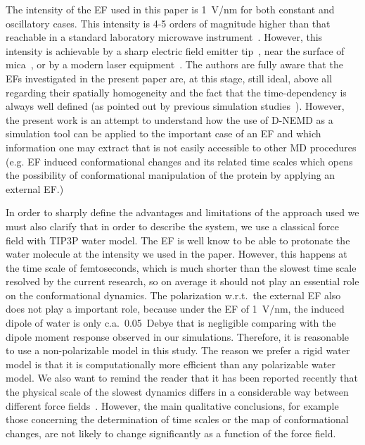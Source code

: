 \documentclass[a4paper,preprint,unsortedaddress,onecolumn]{revtex4-1}
\newcommand{\recheck}[1]{{\color{red} #1}}
\begin{document}
The intensity of the EF used in this paper is 1~V/nm for both constant
and oscillatory cases. This intensity is 4-5 orders of magnitude
higher than that reachable in a standard laboratory microwave
instrument~\cite{damm2012can}. However, this intensity is achievable
by a sharp electric field emitter tip~\cite{scovell2000phase}, near
the surface of mica~\cite{starzyk2013proteins}, or by a modern laser
equipment~\cite{vogel2008femtosecond}. The authors are fully aware
that the EFs investigated in the present paper are, \recheck{at this stage, still ideal, above all regarding their spatially homogeneity and
  the fact that the time-dependency is always well defined (as pointed
out by previous simulation studies~\cite{budi2005electric,
  budi2007effect, budi2008comparative, toschi2008effects,
  astrakas2011electric, astrakas2012structural, damm2012can,
  starzyk2013proteins, english2009nonequilibrium,
  solomentsev2012effects}). However, the present work is an attempt to understand how the use of D-NEMD as a simulation tool can be applied to the important case of an EF and which information one may extract that is not easily accessible to other MD procedures (e.g.  EF induced conformational changes and its related time scales which opens the
possibility of conformational manipulation of the protein by applying
an external EF.)}

\recheck{In order to sharply define the advantages and limitations of the approach used we must also clarify that in order} to describe the system, we use a classical force field with TIP3P water model.
The EF is well know to be able to protonate the water molecule at the
intensity we used in the paper. However, this happens at the time
scale of femtoseconds, which is much shorter than the slowest time
scale resolved by the current research, so on average it should not play an essential role on the conformational dynamics.
The polarization w.r.t.~the external EF also does
not play a important role, because  under the EF of 1~V/nm, the induced dipole
of water is only c.a.~0.05~Debye that is negligible comparing with the
dipole moment response observed in our simulations.  Therefore, it is
reasonable to use a non-polarizable model in this study.  The reason we
prefer a rigid water model is that it is computationally more
efficient than any polarizable water model.  We also want to remind
the reader that it has been reported recently that the physical scale of the slowest
dynamics differs in a considerable way between different force
fields~\cite{vitalini2013speed}. \recheck{However, the main qualitative conclusions, for
example those concerning the determination of time scales or the map of conformational changes, 
are not likely to change significantly as a function of the force field.}




{}

\end{document}
